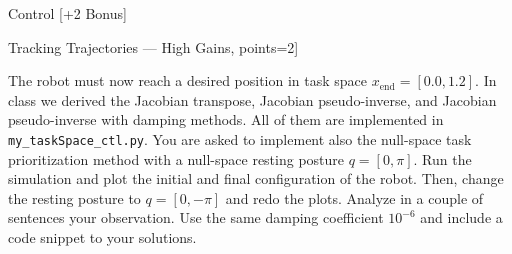 \documentclass[
	ngerman,
	points=true,%
	]{tudaexercise}
\begin{document}
\begin{task}[points=30]{Control [+2 Bonus]}
\begin{subtask}[title= [Bonus] Tracking Trajectories — High Gains, points=2]{}
        \todo \\

    \end{subtask}  
    

    \begin{subtask}[title=Task Space Control, points=5]{}
        The robot must now reach a desired position in task space $x_\textrm{end}={[0.0,1.2]}$. In class we derived the Jacobian transpose, Jacobian pseudo-inverse, and Jacobian pseudo-inverse with damping methods. All of them are implemented in \texttt{my\_taskSpace\_ctl.py}. You are asked to implement also the null-space task prioritization method with a null-space resting posture $q=[0,\pi]$. Run the simulation and plot the initial and final configuration of the robot. Then, change the resting posture to $q=[0,-\pi]$ and redo the plots. Analyze in a couple of sentences your observation. Use the same damping coefficient $10^{-6}$ and include a code snippet to your solutions. \\
        
        \todo \\
        
    \end{subtask} 
    
    
\end{task}
\end{document}
